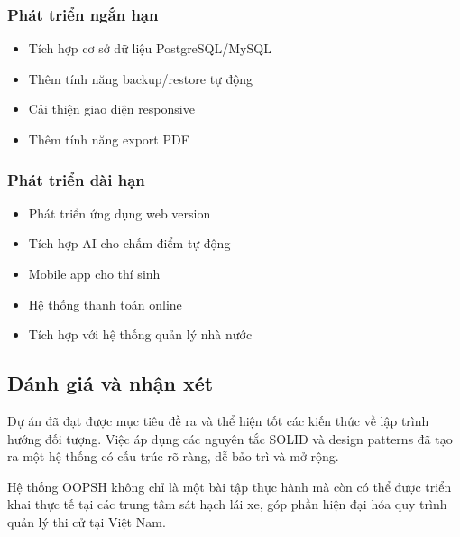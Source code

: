 \documentclass[12pt,a4paper]{article}
\begin{document}
\subsubsection{Phát triển ngắn hạn}
\begin{itemize}
    \item Tích hợp cơ sở dữ liệu PostgreSQL/MySQL
    \item Thêm tính năng backup/restore tự động
    \item Cải thiện giao diện responsive
    \item Thêm tính năng export PDF
\end{itemize}

\subsubsection{Phát triển dài hạn}
\begin{itemize}
    \item Phát triển ứng dụng web version
    \item Tích hợp AI cho chấm điểm tự động
    \item Mobile app cho thí sinh
    \item Hệ thống thanh toán online
    \item Tích hợp với hệ thống quản lý nhà nước
\end{itemize}

\subsection{Đánh giá và nhận xét}

Dự án đã đạt được mục tiêu đề ra và thể hiện tốt các kiến thức về lập trình hướng đối tượng. Việc áp dụng các nguyên tắc SOLID và design patterns đã tạo ra một hệ thống có cấu trúc rõ ràng, dễ bảo trì và mở rộng.

Hệ thống OOPSH không chỉ là một bài tập thực hành mà còn có thể được triển khai thực tế tại các trung tâm sát hạch lái xe, góp phần hiện đại hóa quy trình quản lý thi cử tại Việt Nam.
\end{document}
